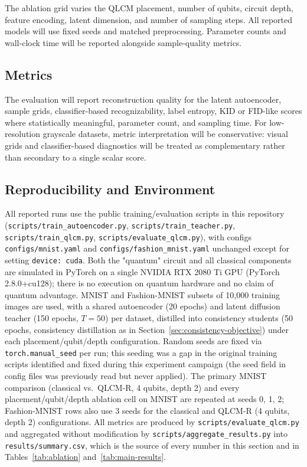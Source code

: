 \documentclass[11pt]{article}
\begin{document}
The ablation grid varies the QLCM placement, number of qubits, circuit depth,
feature encoding, latent dimension, and number of sampling steps. All reported
models will use fixed seeds and matched preprocessing. Parameter counts and
wall-clock time will be reported alongside sample-quality metrics.



\subsection{Metrics}

The evaluation will report reconstruction quality for the latent autoencoder,
sample grids, classifier-based recognizability, label entropy, KID or FID-like
scores where statistically meaningful, parameter count, and sampling time. For
low-resolution grayscale datasets, metric interpretation will be conservative:
visual grids and classifier-based diagnostics will be treated as complementary
rather than secondary to a single scalar score.



\subsection{Reproducibility and Environment}

All reported runs use the public training/evaluation scripts in this
repository (\texttt{scripts/train\_autoencoder.py},
\texttt{scripts/train\_teacher.py}, \texttt{scripts/train\_qlcm.py},
\texttt{scripts/evaluate\_qlcm.py}), with configs
\texttt{configs/mnist.yaml} and \texttt{configs/fashion\_mnist.yaml}
unchanged except for setting \texttt{device: cuda}. Both the "quantum" circuit
and all classical components are simulated in PyTorch on a single NVIDIA RTX
2080 Ti GPU (PyTorch 2.8.0+cu128); there is no execution on quantum hardware
and no claim of quantum advantage. MNIST and Fashion-MNIST subsets of 10{,}000
training images are used, with a shared autoencoder (20 epochs) and latent
diffusion teacher (150 epochs, $T=50$) per dataset, distilled into consistency
students (50 epochs, consistency distillation as in
Section~\ref{sec:consistency-objective}) under each placement/qubit/depth
configuration. Random seeds are fixed via \texttt{torch.manual\_seed} per run;
this seeding was a gap in the original training scripts identified and fixed
during this experiment campaign (the seed field in config files was
previously read but never applied). The primary MNIST comparison (classical
vs.\ QLCM-R, 4 qubits, depth 2) and every placement/qubit/depth ablation cell
on MNIST are repeated at seeds 0, 1, 2; Fashion-MNIST rows also use 3 seeds
for the classical and QLCM-R (4 qubits, depth 2) configurations. All metrics
are produced by \texttt{scripts/evaluate\_qlcm.py} and aggregated without
modification by \texttt{scripts/aggregate\_results.py} into
\texttt{results/summary.csv}, which is the source of every number in this
section and in Tables~\ref{tab:ablation} and~\ref{tab:main-results}.
\end{document}

